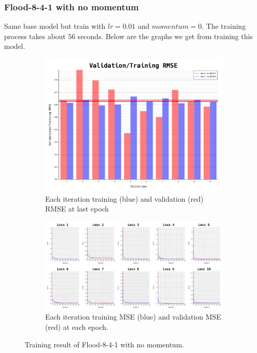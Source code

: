 \documentclass{article}
\begin{document}
\newpage
\subsubsection*{Flood-8-4-1 with no momentum}
Same base model but train with $lr = 0.01$ and $momentum = 0$.
The training process takes about $56$ seconds.
Below are the graphs we get from training this model. 
\begin{figure}[ht]
	\begin{subfigure}{\textwidth}
		\centering
		\includegraphics[scale=0.3]{flood-8-4-1_2/cv_l}
		\caption{Each iteration training (blue) and validation (red) RMSE at last epoch}
		\label{fig:3a}
	\end{subfigure}
	\begin{subfigure}{\textwidth}
		\includegraphics[width=\textwidth]{flood-8-4-1_2/loss}
		\caption{Each iteration training MSE (blue) and validation MSE (red) at each epoch.}
		\label{fig:3b}
	\end{subfigure}
	\caption{Training result of Flood-8-4-1 with no momentum.}
	\label{fig:3}
\end{figure}
\FloatBarrier
\end{document}
